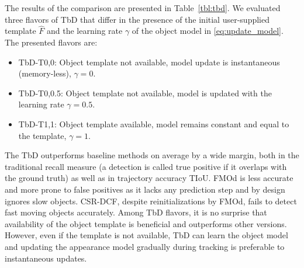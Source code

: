 \documentclass[10pt,twocolumn,letterpaper]{article}
\begin{document}
\begin{table*}
\begin{center}
\begin{tabular}{l|r|c|c|c|c|c|c|c|c|c|c|c}
\hline
\end{tabular}
\end{center}
\caption{Trajectory Intersection over Union (TIoU) and Recall (Rcl) on the TbD dataset -- 
comparison  of the TbD, CSR-DCF\cite{csrdcf} trackers and the Fast Moving Object method~\cite{fmo}. 
CSR-DCF is a standard,  well-performning~\cite{vot2018}, near-real time tracker.
TbD tracker settings: TbD without template and with exponential forgetting factors~\eqref{eq:update_model} $\gamma=0$ (TbD-T0, 0) and $\gamma=0.5$ (TbD-T0, 0.5), TbD with template and $\gamma=1$ (TbD-T1, 1), TbD with oracle (TbD-O). The highest TIoU for each sequence is highlighted in blue color and the highest recall in cyan color. TbD-O shows the highest attainable TIoU for TbD as a reference point when predictions are precise. The number of frames is indicated by \#.}
\label{tbl:tbd}
\end{table*}







%
 The results of the comparison are presented in Table~\ref{tbl:tbd}. We evaluated three flavors of TbD that differ in the presence of the initial user-supplied template $\hat F$ and the learning rate $\gamma$ of the object model in \eqref{eq:update_model}. The presented flavors are:
\vspace*{-1ex}
\begin{itemize}[leftmargin=*]
	\setlength\itemsep{-0.25em}
	\item TbD-T0,0: Object template not available, model update is instantaneous (memory-less), $\gamma=0$.
	\item TbD-T0,0.5: Object template not available, model is updated with the learning rate $\gamma=0.5$.
	\item TbD-T1,1: Object template available, model remains constant and equal to the template, $\gamma=1$.
\end{itemize}
\vspace*{-1ex}
The TbD outperforms baseline methods on average by a wide margin, both in the traditional recall measure (a detection is called true positive if it overlaps with the ground truth) as well as in trajectory accuracy TIoU. FMOd is less accurate and more prone to false positives as it lacks any prediction step and by design ignores slow objects. CSR-DCF, despite reinitializations by FMOd, fails to detect fast moving objects accurately. Among TbD flavors, it is no surprise that availability of the object template is beneficial and outperforms other versions. However, even if the template is not available, TbD can learn the object model and updating the appearance model gradually during tracking is preferable to instantaneous updates.
\end{document}

